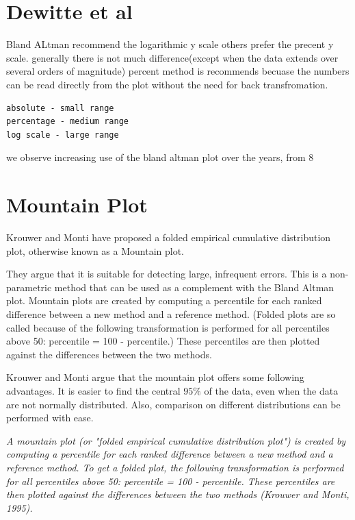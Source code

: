\documentclass[Chap2main.tex]{subfiles}
\begin{document}
\section{Dewitte et al }
Bland ALtman recommend the logarithmic y scale
others prefer the  precent y scale.
generally there is not much difference(except when the data extends over several orders of magnitude)
percent method is recommends becuase the numbers can be read directly from the plot without the need for back transfromation.

\begin{verbatim}
absolute - small range
percentage - medium range
log scale - large range
\end{verbatim}
we observe increasing use of the bland altman plot over the years, from 8%

\newpage
\section{Mountain Plot} Krouwer and Monti have proposed a folded empirical cumulative distribution plot, otherwise known as a Mountain plot.

They argue that it is suitable for detecting large, infrequent errors. This is a non-parametric method that can be used as a complement with the Bland Altman plot.  Mountain plots are created by computing a percentile
for each ranked difference between a new method and a reference method. (Folded plots are so called because of the following transformation is performed for all percentiles above 50: percentile = 100 - percentile.) These percentiles are then plotted against the differences between the two methods.

Krouwer and Monti argue that the mountain plot offers some following advantages. It is easier to find the central $95\%$ of the data, even when the data are not normally distributed. Also, comparison on different distributions can be performed with ease.

\emph{
	A mountain plot (or "folded empirical cumulative distribution plot") is created by computing a percentile for each ranked difference between a new method and a reference method. To get a folded plot, the following transformation is performed for all percentiles above 50: percentile = 100 - percentile. These percentiles are then plotted against the differences between the two methods (Krouwer and Monti, 1995).}
\end{document}
